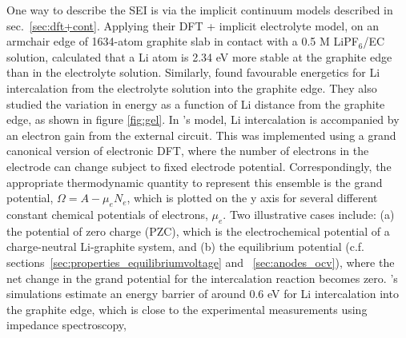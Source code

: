\documentclass[../main.tex]{subfiles}
\begin{document}
One way to describe the SEI is via the implicit continuum models described in sec.~\ref{sec:dft+cont}. Applying their DFT + implicit electrolyte model, on an armchair edge of 1634-atom graphite slab in contact with a 0.5 M LiPF$_6$/EC solution, \citeauthor{Dziedzic2020} calculated that a Li atom is 2.34 eV more stable at the graphite edge than in the electrolyte solution.\cite{Dziedzic2020} Similarly, \citeauthor{haruyama2018} found favourable energetics for Li intercalation from the electrolyte solution into the graphite edge.\cite{haruyama2018} They also studied the variation in energy as a function of Li distance from the graphite edge, as shown in figure \ref{fig:gel}. In \citeauthor{haruyama2018}'s model, Li intercalation is accompanied by an electron gain from the external circuit. This was implemented using a grand canonical version of electronic DFT, where the number of electrons in the electrode can change subject to fixed electrode potential. Correspondingly, the appropriate thermodynamic quantity to represent this ensemble is the grand potential, $\Omega=A-\mu_e N_e$, which is plotted on the y axis for several different constant chemical potentials of electrons, $\mu_e$. Two illustrative cases include: (a) the potential of zero charge (PZC), which is the electrochemical potential of a charge-neutral Li-graphite system, and (b) the equilibrium potential (c.f.  sections~\ref{sec:properties_equilibriumvoltage} and ~\ref{sec:anodes_ocv}), where the net change in the grand potential for the intercalation reaction becomes zero. \citeauthor{haruyama2018}'s simulations estimate an energy barrier of around 0.6 eV for Li intercalation into the graphite edge, which is close to the experimental measurements using impedance spectroscopy,\cite{Yamada2009}
\end{document}
